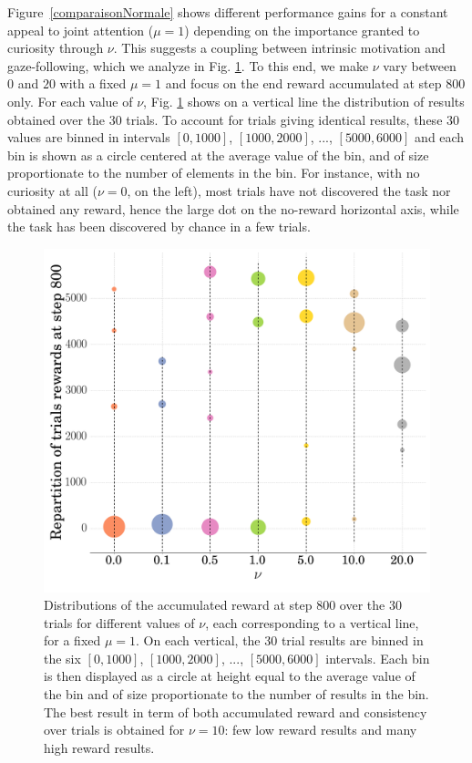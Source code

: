 \documentclass[letterpaper, 10 pt, conference]{ieeeconf}  %
\begin{document}
Figure~\ref{comparaisonNormale} shows different performance gains for a constant appeal to joint attention ($\mu=1$) depending on the importance granted to curiosity through $\nu$. This suggests a coupling between intrinsic motivation and gaze-following, which we analyze in Fig. \ref{TB1}. To this end, we make $\nu$ vary between $0$ and $20$ with a fixed $\mu=1$ and focus on the end reward accumulated at step 800 only. For each value of $\nu$, Fig. \ref{TB1} shows on a vertical line the distribution of results obtained over the 30 trials. To account for trials giving identical results, these 30 values are binned in intervals $[0,1000]$, $[1000,2000]$, ..., $[5000,6000]$ and each bin is shown as a circle centered at the average value of the bin, and of size proportionate to the number of elements in the bin. For instance, with no curiosity at all ($\nu=0$, on the left), most trials have not discovered the task nor obtained any reward, hence the large dot on the no-reward horizontal axis, while the task has been discovered by chance in a few trials.

\begin{figure}[t!]
\includegraphics[width=\linewidth]{boxplotstb1.png}
\caption{Distributions of the accumulated reward at step 800 over the 30 trials for different values of $\nu$, each corresponding to a vertical line, for a fixed $\mu=1$. On each vertical, the 30 trial results are binned in the six $[0,1000]$, $[1000,2000]$, ..., $[5000,6000]$ intervals. Each bin is then displayed as a circle at height equal to the average value of the bin and of size proportionate to the number of results in the bin. The best result in term of both accumulated reward and consistency over trials is obtained for $\nu=10$: few low reward results and many high reward results.}
\label{TB1}
\end{figure}
\end{document}
